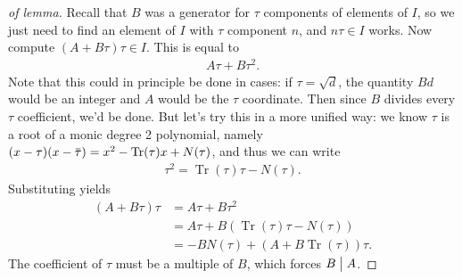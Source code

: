 \begin{proof}[of lemma]

Recall that \(B\) was a generator for \(\tau\) components of elements of
\(I\), so we just need to find an element of \(I\) with \(\tau\)
component \(n\), and \(n \tau \in I\) works. Now compute
\((A + B \tau) \tau\in I\). This is equal to
\begin{align*}
A \tau + B \tau^2
.\end{align*}
Note that this could in principle be done in cases: if
\(\tau = \sqrt{d}\), the quantity \(Bd\) would be an integer and \(A\)
would be the \(\tau\) coordinate. Then since \(B\) divides every
\(\tau\) coefficient, we'd be done. But let's try this in a more unified
way: we know \(\tau\) is a root of a monic degree 2 polynomial, namely
\((x - \tau) (x - \mkern 1.5mu\overline{\mkern-1.5mu\tau\mkern-1.5mu}\mkern 1.5mu) = x^2 - \operatorname{Tr}( \tau)x + N( \tau)\),
and thus we can write
\begin{align*}
\tau^2 = \operatorname{Tr}( \tau) \tau - N( \tau)
.\end{align*}
Substituting yields
\begin{align*}
(A + B \tau) \tau
&= A \tau + B \tau^2 \\
&= A \tau + B ( \operatorname{Tr}( \tau) \tau - N( \tau) ) \\
&= - B N( \tau) + (A + B \operatorname{Tr}( \tau ) ) \tau
.\end{align*}
The coefficient of \(\tau\) must be a multiple of \(B\), which forces
\(B\bigm|A\).

\end{proof}

